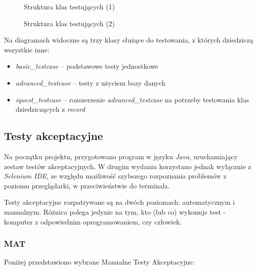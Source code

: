 \newpage
\begin{figure}[H]
\begin{center}
 
\end{center}
\caption{Struktura klas testujących (1)}
\label{fig:tests1}
\end{figure}
\newpage
\begin{figure}[H]
\begin{center}
 
\end{center}
\caption{Struktura klas testujących (2)}
\label{fig:tests2}
\end{figure}
\newpage

Na diagramach widoczne są trzy klasy służące do testowania, z których dziedziczą wszystkie inne:
\begin{itemize}
\item \emph{basic\_testcase} -- podstawowe testy jednostkowe
\item \emph{advanced\_testcase} -- testy z użyciem bazy danych
\item \emph{iquest\_testcase} -- rozszerzenie \emph{advanced\_testcase} na potrzeby testowania klas dziedziczących z \emph{record}
\end{itemize}

\subsection{Testy akceptacyjne}
\label{Chapter713}

Na początku projektu, przygotowano program w języku \textit{Java}, uruchamiający zestaw testów akceptacyjnych. W drugim wydaniu korzystano jednak wyłącznie z \textit{Selenium IDE}, ze względu możliwość szybszego rozpoznania problemów z poziomu przeglądarki, w przeciwieństwie do terminala.

Testy akceptacyjne rozpatrywane są na dwóch poziomach: automatycznym i manualnym. Różnica polega jedynie na tym, kto (lub co) wykonuje test - komputer z odpowiednim oprogramowaniem, czy człowiek.

\subsubsection{MAT}
\label{Chapter7131}
Poniżej przedstawiono wybrane Manualne Testy Akceptacyjne:

\matpres
{}
\matsteps
{}
\matremark{}

